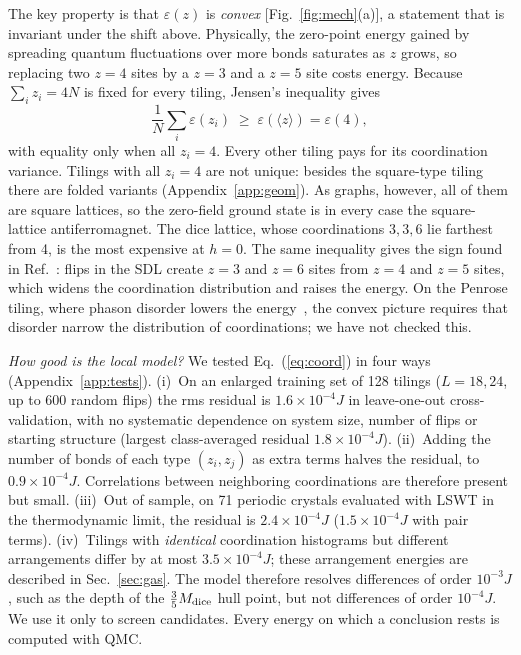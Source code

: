 \documentclass[prb,twocolumn,amsmath,amssymb,floatfix]{revtex4-2}
\newcommand{\Md}{M_{\rm dice}}
\newcommand{\eps}{\varepsilon}
\begin{document}
The key property is that $\eps(z)$ is \emph{convex} [Fig.~\ref{fig:mech}(a)], a statement that is invariant under the shift above. Physically, the zero-point energy gained by spreading quantum fluctuations over more bonds saturates as $z$ grows, so replacing two $z=4$ sites by a $z=3$ and a $z=5$ site costs energy. Because $\sum_iz_i=4N$ is fixed for every tiling, Jensen's inequality gives
\begin{equation}
\frac1N\sum_i\eps(z_i)\;\ge\;\eps(\langle z\rangle)=\eps(4),
\label{eq:jensen}
\end{equation}
with equality only when all $z_i=4$. Every other tiling pays for its coordination variance. Tilings with all $z_i=4$ are not unique: besides the square-type tiling there are folded variants (Appendix~\ref{app:geom}). As graphs, however, all of them are square lattices, so the zero-field ground state is in every case the square-lattice antiferromagnet. The dice lattice, whose coordinations $3,3,6$ lie farthest from 4, is the most expensive at $h=0$. The same inequality gives the sign found in Ref.~\cite{Jagannathan2012}: flips in the SDL create $z=3$ and $z=6$ sites from $z=4$ and $z=5$ sites, which widens the coordination distribution and raises the energy. On the Penrose tiling, where phason disorder lowers the energy~\cite{Szallas2009}, the convex picture requires that disorder narrow the distribution of coordinations; we have not checked this.

\emph{How good is the local model?} We tested Eq.~(\ref{eq:coord}) in four ways (Appendix~\ref{app:tests}). (i)~On an enlarged training set of 128 tilings ($L=18,24$, up to 600 random flips) the rms residual is $1.6\times10^{-4}J$ in leave-one-out cross-validation, with no systematic dependence on system size, number of flips or starting structure (largest class-averaged residual $1.8\times10^{-4}J$). (ii)~Adding the number of bonds of each type $(z_i,z_j)$ as extra terms halves the residual, to $0.9\times10^{-4}J$. Correlations between neighboring coordinations are therefore present but small. (iii)~Out of sample, on 71 periodic crystals evaluated with LSWT in the thermodynamic limit, the residual is $2.4\times10^{-4}J$ ($1.5\times10^{-4}J$ with pair terms). (iv)~Tilings with \emph{identical} coordination histograms but different arrangements differ by at most $3.5\times10^{-4}J$; these arrangement energies are described in Sec.~\ref{sec:gas}. The model therefore resolves differences of order $10^{-3}J$, such as the depth of the $\frac35\Md$ hull point, but not differences of order $10^{-4}J$. We use it only to screen candidates. Every energy on which a conclusion rests is computed with QMC.
\end{document}
